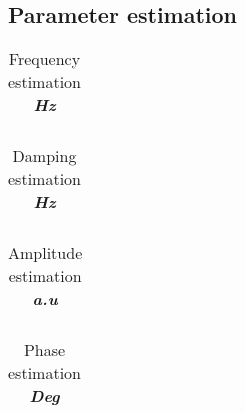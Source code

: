 \subsection{Parameter estimation}\label{Ap32}

 \begin{table}[!htbp]
\centering
\caption{Frequency estimation \textbf{\textit{Hz}}}

\begin{tabular}{c c c c c c c c c c c c c c c c c c c c c c c c c c c c c c c } 
\hline 

  
  

\hline 
\end{tabular}
\end{table}





 \begin{table}[!htbp]
\centering
\caption{Damping estimation \textbf{\textit{Hz}}}

\begin{tabular}{c c c c c c c c c c c c c c c c c c c c c c c c c c c c c c c } 
\hline 
 



\hline 
\end{tabular}
\end{table}





 \begin{table}[!htbp]
\centering
\caption{Amplitude estimation \textbf{\textit{a.u}}}

\begin{tabular}{c c c c c c c c c c c c c c c c c c c c c c c c c c c c c c c } 
\hline 

 

\hline 
\end{tabular}
\end{table}



 \begin{table}[!htbp]
\centering
\caption{Phase estimation \textbf{\textit{Deg}}}

\begin{tabular}{c c c c c c c c c c c c c c c c c c c c c c c c c c c c c c c } 
\hline 
   


\hline 
\end{tabular}
\end{table}  
    
